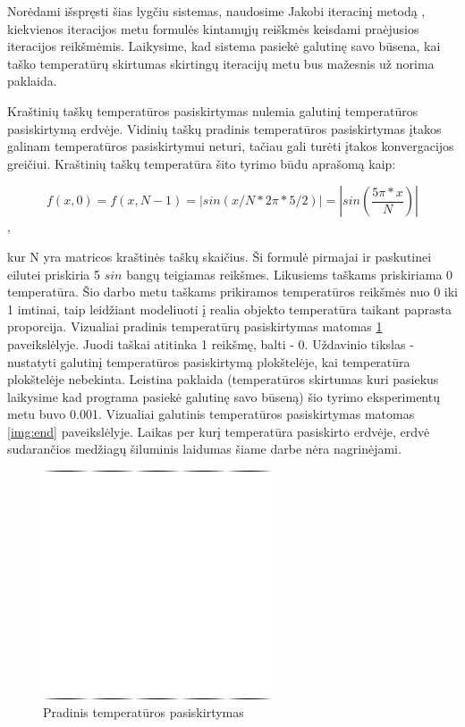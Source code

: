 \documentclass{VUMIFPSbakalaurinis}
\begin{document}
Norėdami išspręsti šias lygčiu sistemas, naudosime Jakobi iteracinį metodą \cite{burden2011numerical}, kiekvienos iteracijos metu formulės kintamųjų reiškmės keisdami praėjusios iteracijos reikšmėmis.
Laikysime, kad sistema pasiekė galutinę savo būsena, kai taško temperatūrų skirtumas skirtingų iteracijų metu bus mažesnis už norima paklaida.

Kraštinių taškų temperatūros pasiskirtymas nulemia galutinį temperatūros pasiskirtymą erdvėje.
Vidinių taškų pradinis temperatūros pasiskirtymas įtakos galinam temperatūros pasiskirtymui neturi, tačiau gali turėti įtakos konvergacijos greičiui.
Kraštinių taškų temperatūra šito tyrimo būdu aprašomą kaip:

\[ f(x, 0) = f(x, N-1) = |sin(x/N * 2\pi * 5/2)| = |sin(\frac{5\pi * x}{N})| \], 

kur N yra matricos kraštinės taškų skaičius.
Ši formulė pirmajai ir paskutinei eilutei priskiria 5 $sin$ bangų teigiamas reikšmes.
Likusiems taškams priskiriama 0 temperatūra.
Šio darbo metu taškams prikiramos temperatūros reikšmės nuo 0 iki 1 imtinai, taip leidžiant modeliuoti į realia objekto temperatūra taikant paprasta proporcija.
Vizualiai pradinis temperatūrų pasiskirtymas matomas \ref{img:start} paveikslėlyje.
Juodi taškai atitinka 1 reikšmę, balti - 0.
Uždavinio tikslas - nustatyti galutinį temperatūros pasiskirtymą plokštelėje, kai temperatūra plokštelėje nebekinta.
Leistina paklaida (temperatūros skirtumas kuri pasiekus laikysime kad programa pasiekė galutinę savo būseną) šio tyrimo eksperimentų metu buvo 0.001.  
Vizualiai galutinis temperatūros pasiskirtymas matomas \ref{img:end} paveikslėlyje.
Laikas per kurį temperatūra pasiskirto erdvėje, erdvė sudarančios medžiagų šiluminis laidumas šiame darbe nėra nagrinėjami. 

\begin{figure}[H]
    \centering
    \includegraphics[scale=0.7]{img/image_0000000.png}
    \caption{Pradinis temperatūros pasiskirtymas}
    \label{img:start}
\end{figure}
\end{document}
